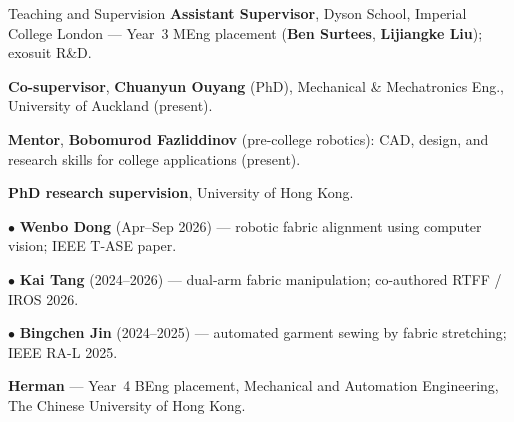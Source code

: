 \begin{rubric}{Teaching and Supervision}
        \textbf{Assistant Supervisor}, Dyson School, Imperial College London --- Year~3 MEng placement (\textbf{Ben Surtees}, \textbf{Lijiangke Liu}); exosuit R\&D.

    \entry*[Jul 2026--]%
        \textbf{Co-supervisor}, \textbf{Chuanyun Ouyang} (PhD), Mechanical \& Mechatronics Eng., University of Auckland (present).

    \entry*[Sep 2026--]%
        \textbf{Mentor}, \textbf{Bobomurod Fazliddinov} (pre-college robotics): CAD, design, and research skills for college applications (present).

    \entry*[2024 -- 2026]%
        \textbf{PhD research supervision}, University of Hong Kong.
        \par $\bullet$ \textbf{Wenbo Dong} (Apr--Sep 2026) --- robotic fabric alignment using computer vision; IEEE T-ASE paper.
        \par $\bullet$ \textbf{Kai Tang} (2024--2026) --- dual-arm fabric manipulation; co-authored RTFF / IROS 2026.
        \par $\bullet$ \textbf{Bingchen Jin} (2024--2025) --- automated garment sewing by fabric stretching; IEEE RA-L 2025.

    \entry*[2023 -- 2024]%
        \textbf{Herman} --- Year~4 BEng placement, Mechanical and Automation Engineering, The Chinese University of Hong Kong.

    \end{rubric}

